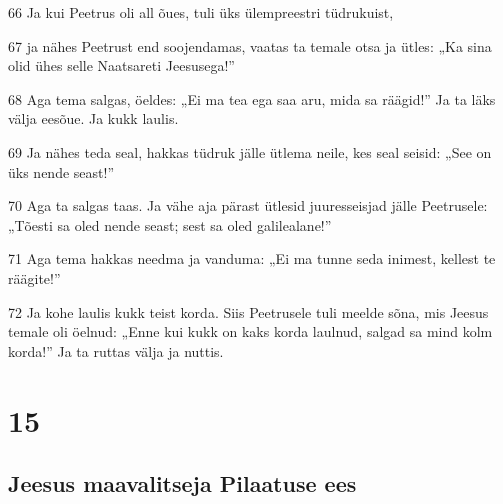 \par 66 Ja kui Peetrus oli all õues, tuli üks ülempreestri tüdrukuist,
\par 67 ja nähes Peetrust end soojendamas, vaatas ta temale otsa ja ütles: „Ka sina olid ühes selle Naatsareti Jeesusega!”
\par 68 Aga tema salgas, öeldes: „Ei ma tea ega saa aru, mida sa räägid!” Ja ta läks välja eesõue. Ja kukk laulis.
\par 69 Ja nähes teda seal, hakkas tüdruk jälle ütlema neile, kes seal seisid: „See on üks nende seast!”
\par 70 Aga ta salgas taas. Ja vähe aja pärast ütlesid juuresseisjad jälle Peetrusele: „Tõesti sa oled nende seast; sest sa oled galilealane!”
\par 71 Aga tema hakkas needma ja vanduma: „Ei ma tunne seda inimest, kellest te räägite!”
\par 72 Ja kohe laulis kukk teist korda. Siis Peetrusele tuli meelde sõna, mis Jeesus temale oli öelnud: „Enne kui kukk on kaks korda laulnud, salgad sa mind kolm korda!” Ja ta ruttas välja ja nuttis.


\chapter{15}

\section*{Jeesus maavalitseja Pilaatuse ees}

